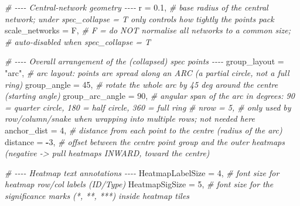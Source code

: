\documentclass[
]{book}
\newenvironment{Shaded}{\begin{snugshade}}{\end{snugshade}}
\newcommand{\AttributeTok}[1]{\textcolor[rgb]{0.13,0.29,0.53}{#1}}
\newcommand{\CommentTok}[1]{\textcolor[rgb]{0.56,0.35,0.01}{\textit{#1}}}
\newcommand{\DecValTok}[1]{\textcolor[rgb]{0.00,0.00,0.81}{#1}}
\newcommand{\FloatTok}[1]{\textcolor[rgb]{0.00,0.00,0.81}{#1}}
\newcommand{\NormalTok}[1]{#1}
\newcommand{\SpecialCharTok}[1]{\textcolor[rgb]{0.81,0.36,0.00}{\textbf{#1}}}
\newcommand{\StringTok}[1]{\textcolor[rgb]{0.31,0.60,0.02}{#1}}
\begin{document}
\begin{Shaded}
\begin{Highlighting}[]
  \CommentTok{\# {-}{-}{-}{-} Central{-}network geometry {-}{-}{-}{-}}
  \AttributeTok{r                  =} \FloatTok{0.1}\NormalTok{,                  }\CommentTok{\# base radius of the central network; under spec\_collapse = T only controls how tightly the points pack}
  \AttributeTok{scale\_networks     =}\NormalTok{ F,                    }\CommentTok{\# F = do NOT normalise all networks to a common size;}
                                             \CommentTok{\#     auto{-}disabled when spec\_collapse = T}

  \CommentTok{\# {-}{-}{-}{-} Overall arrangement of the (collapsed) spec points {-}{-}{-}{-}}
  \AttributeTok{group\_layout       =} \StringTok{"arc"}\NormalTok{,                }\CommentTok{\# arc layout: points are spread along an ARC (a partial circle, not a full ring)}
  \AttributeTok{group\_angle        =} \DecValTok{45}\NormalTok{,                   }\CommentTok{\# rotate the whole arc by 45 deg around the centre (starting angle)}
  \AttributeTok{group\_arc\_angle    =} \DecValTok{90}\NormalTok{,                   }\CommentTok{\# angular span of the arc in degrees: 90 = quarter circle, 180 = half circle, 360 = full ring}
  \CommentTok{\# nrow             = 5,                    \# only used by row/column/snake when wrapping into multiple rows; not needed here}
  \AttributeTok{anchor\_dist        =} \DecValTok{4}\NormalTok{,                    }\CommentTok{\# distance from each point to the centre (radius of the arc)}
  \AttributeTok{distance           =} \SpecialCharTok{{-}}\DecValTok{3}\NormalTok{,                   }\CommentTok{\# offset between the centre point group and the outer heatmaps (negative {-}\textgreater{} pull heatmaps INWARD, toward the centre)}

  \CommentTok{\# {-}{-}{-}{-} Heatmap text annotations {-}{-}{-}{-}}
  \AttributeTok{HeatmapLabelSize   =} \DecValTok{4}\NormalTok{,                    }\CommentTok{\# font size for heatmap row/col labels (ID/Type)}
  \AttributeTok{HeatmapSigSize     =} \DecValTok{5}\NormalTok{,                    }\CommentTok{\# font size for the significance marks (*, **, ***) inside heatmap tiles}


\end{Highlighting}
\end{Shaded}
\end{document}
